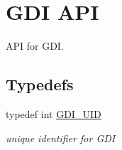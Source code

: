 \hypertarget{group__hgdi__api}{
\section{GDI API}
\label{group__hgdi__api}
}
API for GDI.  


\subsection*{Typedefs}
\begin{CompactItemize}
\item 
\hypertarget{group__hgdi__api_g45f1f4ec61f7d1369d94ffba402c6adb}{
typedef int \hyperlink{group__hgdi__api_g45f1f4ec61f7d1369d94ffba402c6adb}{GDI\_\-UID}}
\label{group__hgdi__api_g45f1f4ec61f7d1369d94ffba402c6adb}

\begin{CompactList}\small\item\em unique identifier for GDI \item\end{CompactList}\end{CompactItemize}
